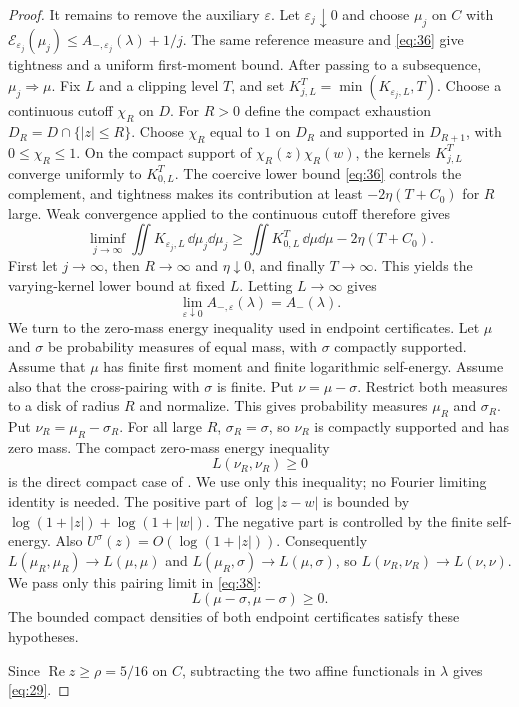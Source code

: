 \begin{proof}
It remains to remove the auxiliary $\varepsilon$. Let
$\varepsilon_j\downarrow0$ and choose $\mu_j$ on $C$ with
${\mathcal E}_{\varepsilon_j}(\mu_j)\le A_{-,\varepsilon_j}(\lambda)+1/j$.
The same reference measure and \eqref{eq:36} give tightness and a uniform
first-moment bound. After passing to a subsequence, $\mu_j\Rightarrow\mu$.
Fix $L$ and a clipping level $T$, and set
$K_{j,L}^T=\min(K_{\varepsilon_j,L},T)$. Choose a continuous cutoff
$\chi_R$ on $D$. For $R>0$ define the compact exhaustion
$D_R=D\cap\{|z|\le R\}$. Choose $\chi_R$ equal to $1$ on $D_R$ and
supported in $D_{R+1}$, with $0\le\chi_R\le1$. On the compact support of
$\chi_R(z)\chi_R(w)$, the kernels $K_{j,L}^T$ converge uniformly to
$K_{0,L}^T$. The coercive lower bound \eqref{eq:36} controls the complement,
and tightness makes its contribution at least $-2\eta(T+C_0)$ for $R$ large.
Weak convergence applied to the continuous cutoff therefore gives
\[
 \liminf_{j\to\infty}\iint K_{\varepsilon_j,L}\,\dd\mu_j\dd\mu_j
 \ge \iint K_{0,L}^T\,\dd\mu\dd\mu-2\eta(T+C_0).
\]
First let $j\to\infty$, then $R\to\infty$ and $\eta\downarrow0$, and
finally $T\to\infty$. This yields the varying-kernel lower bound at fixed
$L$. Letting $L\to\infty$ gives
\begin{equation}
 \lim_{\varepsilon\downarrow0}A_{-,\varepsilon}(\lambda)=A_-(\lambda). \label{eq:38a}
\end{equation}
We turn to the zero-mass energy inequality used in endpoint certificates.
Let $\mu$ and $\sigma$ be probability measures of equal mass, with $\sigma$
compactly supported. Assume that $\mu$ has finite first moment and finite
logarithmic self-energy. Assume also that the cross-pairing with $\sigma$ is
finite.
Put $\nu=\mu-\sigma$. Restrict both
measures to a disk of radius $R$ and normalize. This gives probability
measures $\mu_R$ and ${\sigma}_R$. Put $\nu_R=\mu_R-{\sigma}_R$. For all
large $R$, ${\sigma}_R=\sigma$, so $\nu_R$ is compactly supported and has
zero mass.
The compact zero-mass energy inequality
\begin{equation}
 L(\nu_R,\nu_R)\ge0                                      \label{eq:38}
\end{equation}
is the direct compact case of \cite[Lemma~I.1.8]{SaffTotik}. We use only
this inequality; no Fourier limiting identity is needed.
The positive part of $\log|z-w|$ is bounded by
$\log(1+|z|)+\log(1+|w|)$. The negative part is controlled by the finite
self-energy. Also $U^\sigma(z)=O(\log(1+|z|))$. Consequently
$L(\mu_R,\mu_R)\to L(\mu,\mu)$ and
$L(\mu_R,\sigma)\to L(\mu,\sigma)$, so
$L(\nu_R,\nu_R)\to L(\nu,\nu)$. We pass only this pairing limit in
\eqref{eq:38}:
\begin{equation}
 L(\mu-\sigma,\mu-\sigma)\ge0.                         \label{eq:38b}
\end{equation}
The bounded compact densities of both endpoint certificates satisfy these
hypotheses.

Since $\operatorname{Re} z\ge\rho=5/16$ on $C$, subtracting the two affine
functionals in $\lambda$ gives \eqref{eq:29}.
\qedhere
\end{proof}

